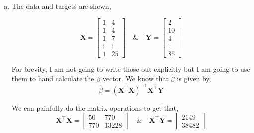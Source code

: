 \documentclass[12pt,letterpaper, onecolumn]{exam}
\begin{document}
\begin{questions}
\begin{solution}
\begin{enumerate}[a.)]
            This gives an overall linear regression of,
            \begin{equation*}
                \widehat{\text{dist}}_i=-17.579 + 3.932\text{speed}_i
            \end{equation*}
    
            What $\beta_1$ means is that the distance required to stop goes up by 3.932 feet for every mph increase of speed. 
    
            \item 

            The data and targets are shown,

            \begin{equation*}
                \textbf{X} = \left[\begin{array}{cc}
                    1 & 4 \\
                    1 & 4 \\
                    1 & 7 \\
                    \vdots & \vdots \\
                    1 & 25
                \end{array} \right] \quad \& \quad \textbf{Y} = \left[\begin{array}{c}
                    2 \\ 10 \\ 4 \\
                    \vdots  \\
                    85
                \end{array} \right]
            \end{equation*}

            For brevity, I am not going to write those out explicitly but I am going to use them to hand calculate the $\beta$ vector. We know that $\hat \beta$ is given by,
            \begin{equation*}
                \hat\beta = ( \textbf{X}^\intercal\textbf{X})^{-1}\textbf{X}^\intercal\textbf{Y}
            \end{equation*}

            We can painfully do the matrix operations to get that,
            \begin{equation*}
                \textbf{X}^\intercal\textbf{X} = \left[\begin{array}{cc}
                    50 & 770 \\ 770 & 13228
                \end{array} \right] \quad \& \quad \textbf{X}^\intercal\textbf{Y} = \left[\begin{array}{c}
                    2149 \\ 38482
                \end{array} \right]
            \end{equation*}


\end{enumerate}
\end{solution}
\end{questions}
\end{document}
